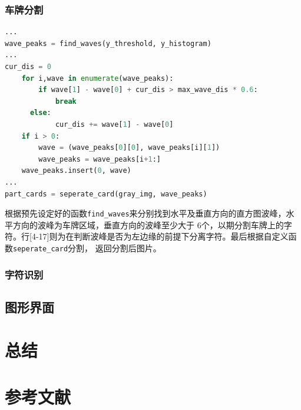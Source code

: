 \documentclass[UTF8,10pt,titlepage,a4paper]{ctexart}
\begin{document}
\subsubsection{车牌分割}
\begin{lstlisting}[language=python]
...
wave_peaks = find_waves(y_threshold, y_histogram)
...
cur_dis = 0
	for i,wave in enumerate(wave_peaks):
		if wave[1] - wave[0] + cur_dis > max_wave_dis * 0.6:
			break
	  else:
			cur_dis += wave[1] - wave[0]
	if i > 0:
		wave = (wave_peaks[0][0], wave_peaks[i][1])
		wave_peaks = wave_peaks[i+1:]
    wave_peaks.insert(0, wave)
...
part_cards = seperate_card(gray_img, wave_peaks)
\end{lstlisting} 
根据预先设定好的函数\verb|find_waves|来分别找到水平及垂直方向的直方图波峰，水平方向的波峰为车牌区域，垂直方向的波峰至少大于
6个，以期分割车牌上的字符。行[4-17]则为在判断波峰是否为左边缘的前提下分离字符。最后根据自定义函数\verb|seperate_card|分割，
返回分割后图片。
\subsubsection{字符识别}








\subsection{图形界面}
\section{总结}
\section{参考文献}
% 
\end{document}
